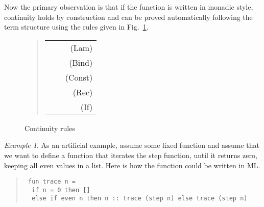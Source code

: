 \documentclass[copyright,creativecommons,sharealike]{eptcs}
\theoremstyle{remark}
\newtheorem{example}{Example}
\begin{document}
\begin{isabellebody}
\begin{isamarkuptext}
  Now the primary observation is that if the function is
  written in monadic style, continuity holds by construction and can be proved 
  automatically following the term structure using the rules given in Fig.~\ref{fig:cont}.
  \begin{figure}
  \begin{quote}
  \begin{tabular}{lcr}
  \isa{{\isacharparenleft}{\isasymAnd}y{\isachardot}\ cont\ {\isacharparenleft}{\isasymlambda}x{\isachardot}\ f\ x\ y{\isacharparenright}{\isacharparenright}\ {\isasymLongrightarrow}\ cont\ f}&&{\sc (Lam)}\\
  \isa{cont\ f\ {\isasymLongrightarrow}\ {\isacharparenleft}{\isasymAnd}y{\isachardot}\ cont\ {\isacharparenleft}g\ y{\isacharparenright}{\isacharparenright}\ {\isasymLongrightarrow}\ cont\ {\isacharparenleft}{\isasymlambda}x{\isachardot}\ do\ y\ {\isasymleftarrow}\ f\ x{\isacharsemicolon}\ g\ y\ x\ done{\isacharparenright}}&&{\sc (Bind)}\\
  \isa{cont\ {\isacharparenleft}{\isasymlambda}x{\isachardot}\ c{\isacharparenright}}&& {\sc (Const)}\\
  \isa{cont\ {\isacharparenleft}{\isasymlambda}f{\isachardot}\ f\ x{\isacharparenright}}&& {\sc (Rec)}\\
  \isa{cont\ f\ {\isasymLongrightarrow}\ cont\ g\ {\isasymLongrightarrow}\ cont\ {\isacharparenleft}{\isasymlambda}x{\isachardot}\ if\ b\ then\ f\ x\ else\ g\ x{\isacharparenright}}&& {\sc (If)}
  \end{tabular}
  \end{quote}
  \caption{Continuity rules}\label{fig:cont}
  \end{figure}

  \begin{example}As an artificial example,
  assume some fixed function 
  and assume that we want to define a function 
   that iterates the step
  function, until it returns zero, keeping all even values in a list.
  Here is how the function could be written in ML.\newpage

  \begin{quote}\upshape\tt
  fun trace n = \\
  \mbox{}~~if n = 0 then []\\
  \mbox{}~~else if even n then n ::~trace (step n) else trace (step n)
  \end{quote}\end{example}


\end{isamarkuptext}
\end{isabellebody}
\end{document}

